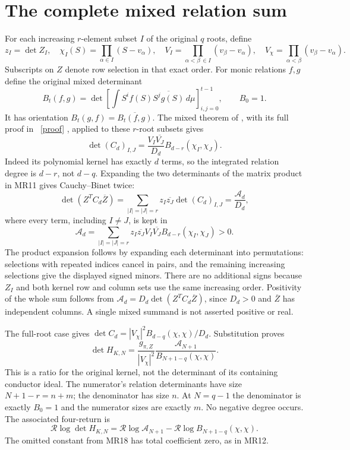 \documentclass[11pt]{article}
\begin{document}
\section{The complete mixed relation sum}
For each increasing $r$-element subset $I$ of the original $q$ roots,
define
\[
 z_I=\det Z_I,\quad
 \chi_I(S)=\prod_{\alpha\in I}(S-v_\alpha),\quad
 V_I=\prod_{\alpha<\beta\,\in I}(v_\beta-v_\alpha),\quad
 V_\chi=\prod_{\alpha<\beta}(v_\beta-v_\alpha).\tag{MR13}
\]
Subscripts on $Z$ denote row selection in that exact order.
For monic relations $f,g$ define the original mixed determinant
\[
 B_t(f,g)=\det\left[\int S^if(S)
                    \overline{S^jg(S)}\,d\mu\right]_{i,j=0}^{t-1},
 \qquad B_0=1.\tag{MR14}
\]
It has orientation $B_t(g,f)=\overline{B_t(f,g)}$.
The mixed theorem of \cite{mrroot:AV}, with its full proof in \cite{mrroot:Mixed}%
~\href{https://github.com/KokunoYumeto/zeta-function-research-reader/blob/5992ad50c0f2a06921f1fcaded7b4e38097c0739/workbenches/splitzero-tandem/continuations/20260920-original-kernel-mixed-determinants/MIXED_CONFLUENT_PROOF.tex\#L1}{[proof]}%
{},
applied to these $r$-root subsets gives
\[
 \det(C_d)_{I,J}
  =\frac{V_I\overline{V_J}}{D_d}
           B_{d-r}(\chi_I,\chi_J).\tag{MR15}
\]
Indeed its polynomial kernel has exactly $d$ terms, so the integrated
relation degree is $d-r$, not $d-q$. Expanding the two determinants
of the matrix product in MR11 gives Cauchy--Binet twice:
\[
 \det(Z^TC_d\overline Z)
  =\sum_{|I|=|J|=r}z_I\overline{z_J}\det(C_d)_{I,J}
  =\frac{\mathcal A_d}{D_d},\tag{MR16}
\]
where every term, including $I\ne J$, is kept in
\[
 \mathcal A_d=
 \sum_{|I|=|J|=r}z_I\overline{z_J}V_I\overline{V_J}
                     B_{d-r}(\chi_I,\chi_J)>0.\tag{MR17}
\]
The product expansion follows by expanding each determinant into
permutations: selections with repeated indices cancel in pairs, and
the remaining increasing selections give the displayed signed minors.
There are no additional signs because $Z_I$ and both kernel row and
column sets use the same increasing order.
Positivity of the whole sum follows from
$\mathcal A_d=D_d\det(Z^TC_d\overline Z)$, since $D_d>0$ and
$\overline Z$ has independent columns. A single mixed summand is not
asserted positive or real.

The full-root case gives
$\det C_d=|V_\chi|^2 B_{d-q}(\chi,\chi)/D_d$. Substitution proves
\[
 \boxed{\det H_{K,N}
   =\frac{g_{\pi,Z}}{|V_\chi|^2}
      \frac{\mathcal A_{N+1}}{B_{N+1-q}(\chi,\chi)}.}
 \tag{MR18}
\]
This is a ratio for the original kernel, not the determinant of its
containing conductor ideal. The numerator's relation determinants
have size $N+1-r=n+m$; the denominator has size $n$. At $N=q-1$ the
denominator is exactly $B_0=1$ and the numerator sizes are exactly $m$.
No negative degree occurs. The associated four-return is
\[
 \boxed{\mathcal R\log\det H_{K,N}
   =\mathcal R\log\mathcal A_{N+1}
      -\mathcal R\log B_{N+1-q}(\chi,\chi).}\tag{MR19}
\]
The omitted constant from MR18 has total coefficient zero, as in MR12.
\end{document}

